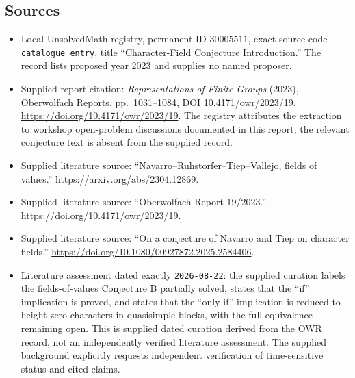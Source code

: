 \documentclass[11pt]{article}
\begin{document}
\subsection{Sources}
\begin{itemize}
\item Local UnsolvedMath registry, permanent ID \(30005511\), exact source code \texttt{catalogue entry}, title ``Character-Field Conjecture Introduction.'' The record lists proposed year 2023 and supplies no named proposer.
\item Supplied report citation: \emph{Representations of Finite Groups} (2023), Oberwolfach Reports, pp.~1031--1084, DOI 10.4171/owr/2023/19. \url{https://doi.org/10.4171/owr/2023/19}. The registry attributes the extraction to workshop open-problem discussions documented in this report; the relevant conjecture text is absent from the supplied record.
\item Supplied literature source: ``Navarro--Ruhstorfer--Tiep--Vallejo, fields of values.'' \url{https://arxiv.org/abs/2304.12869}.
\item Supplied literature source: ``Oberwolfach Report 19/2023.'' \url{https://doi.org/10.4171/owr/2023/19}.
\item Supplied literature source: ``On a conjecture of Navarro and Tiep on character fields.'' \url{https://doi.org/10.1080/00927872.2025.2584406}.
\item Literature assessment dated exactly \texttt{2026-08-22}: the supplied curation labels the fields-of-values Conjecture B partially solved, states that the ``if'' implication is proved, and states that the ``only-if'' implication is reduced to height-zero characters in quasisimple blocks, with the full equivalence remaining open. This is supplied dated curation derived from the OWR record, not an independently verified literature assessment. The supplied background explicitly requests independent verification of time-sensitive status and cited claims.
\end{itemize}
\end{document}
